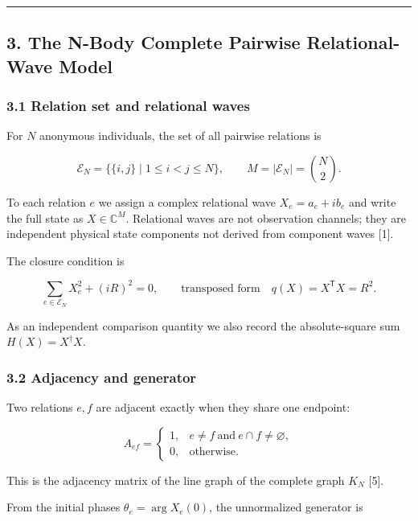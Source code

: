 \documentclass[
  a4paper,
]{article}
\begin{document}
\begin{center}\rule{0.5\linewidth}{0.5pt}\end{center}

\subsection{3. The N-Body Complete Pairwise Relational-Wave
Model}\label{the-n-body-complete-pairwise-relational-wave-model}

\subsubsection{3.1 Relation set and relational
waves}\label{relation-set-and-relational-waves}

For \(N\) anonymous individuals, the set of all pairwise relations is

\[
\mathcal E_N
=
\bigl\{\{i,j\}\mid 1\le i<j\le N\bigr\},
\qquad
M=\lvert\mathcal E_N\rvert=\binom{N}{2}.
\]

To each relation \(e\) we assign a complex relational wave
\(X_e=a_e+ib_e\) and write the full state as \(X\in\mathbb C^M\).
Relational waves are not observation channels; they are independent
physical state components not derived from component waves {[}1{]}.

The closure condition is

\[
\sum_{e\in\mathcal E_N}X_e^2+(iR)^2=0,
\qquad
\text{transposed form}\quad
q(X)=X^{\mathsf T}X=R^2.
\]

As an independent comparison quantity we also record the absolute-square
sum \(H(X)=X^\dagger X\).

\subsubsection{3.2 Adjacency and
generator}\label{adjacency-and-generator}

Two relations \(e,f\) are adjacent exactly when they share one endpoint:

\[
A_{ef}
=
\begin{cases}
1,& e\ne f\ \text{and}\ e\cap f\ne\varnothing,\\
0,& \text{otherwise}.
\end{cases}
\]

This is the adjacency matrix of the line graph of the complete graph
\(K_N\) {[}5{]}.

From the initial phases \(\theta_e=\arg X_e(0)\), the unnormalized
generator is
\end{document}
